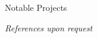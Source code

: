 \documentclass{resume}
\begin{document}
\begin{rSection}{Notable Projects}

\end{rSection}


    

%
%
\vspace{8pt}
\begin{center}
    {\em References upon request}
\end{center}
\end{document}
